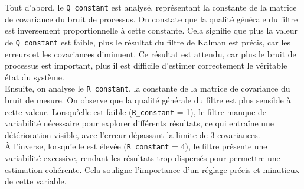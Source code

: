 \documentclass[../CSC_5RO12_TA_TP4.tex]{subfiles}
\begin{document}
\noindent Tout d'abord, le \texttt{Q\_constant} est analysé, représentant la constante de la matrice de covariance du bruit de processus. On constate que la qualité générale du filtre est inversement proportionnelle à cette constante. Cela signifie que plus la valeur de \texttt{Q\_constant} est faible, plus le résultat du filtre de Kalman est précis, car les erreurs et les covariances diminuent. Ce résultat est attendu, car plus le bruit de processus est important, plus il est difficile d'estimer correctement le véritable état du système.\\

\noindent Ensuite, on analyse le \texttt{R\_constant}, la constante de la matrice de covariance du bruit de mesure. On observe que la qualité générale du filtre est plus sensible à cette valeur. Lorsqu'elle est faible (\texttt{R\_constant} = 1), le filtre manque de variabilité nécessaire pour explorer différents résultats, ce qui entraîne une détérioration visible, avec l'erreur dépassant la limite de 3 covariances.\\

\noindent À l'inverse, lorsqu'elle est élevée (\texttt{R\_constant} = 4), le filtre présente une variabilité excessive, rendant les résultats trop dispersés pour permettre une estimation cohérente. Cela souligne l'importance d'un réglage précis et minutieux de cette variable.
\end{document}
